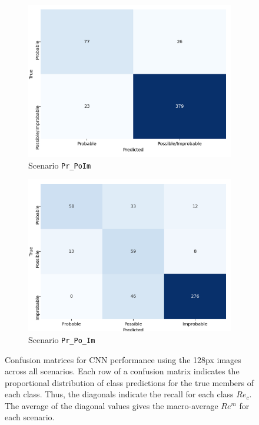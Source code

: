 \documentclass[Journal,letterpaper, SingleSpace, InsideFigs]{ascelike-new}
\begin{document}
\begin{figure}[ht]
  \begin{subfigure}[t]{.25\linewidth}
    \centering
    \includegraphics[width=\linewidth]{opt-confusion-matrix-Pr_PoIm-128-px.png}
    \caption{Scenario \texttt{Pr\_PoIm}}
    \label{pr_poim_cm}
\end{subfigure}%
  \begin{subfigure}[t]{.25\linewidth}
    \centering
    \includegraphics[width=\linewidth]{opt-confusion-matrix-Pr_Po_Im-128-px.png}
    \caption{Scenario \texttt{Pr\_Po\_Im}}
    \label{pr_po_im_cm}
  \end{subfigure}%
    \caption{Confusion matrices for CNN performance using the 128px images across all scenarios.
    Each row of a confusion matrix indicates the proportional distribution of class predictions for the true members of each class. Thus, the diagonals indicate the recall for each class $Re_c$. The average of the diagonal values gives the macro-average $Re^m$ for each scenario.}
    \label{fig:confusion-matrix}
\end{figure}
\end{document}
